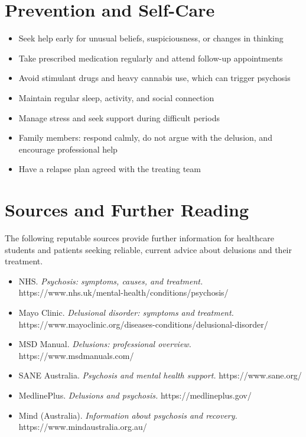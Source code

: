 \section*{Prevention and Self-Care}
\begin{itemize}
    \item Seek help early for unusual beliefs, suspiciousness, or changes in thinking
    \item Take prescribed medication regularly and attend follow-up appointments
    \item Avoid stimulant drugs and heavy cannabis use, which can trigger psychosis
    \item Maintain regular sleep, activity, and social connection
    \item Manage stress and seek support during difficult periods
    \item Family members: respond calmly, do not argue with the delusion, and encourage professional help
    \item Have a relapse plan agreed with the treating team
\end{itemize}

\section*{Sources and Further Reading}
The following reputable sources provide further information for healthcare students and patients seeking reliable, current advice about delusions and their treatment.

\begin{itemize}
    \item NHS. \textit{Psychosis: symptoms, causes, and treatment.} https://www.nhs.uk/mental-health/conditions/psychosis/
    \item Mayo Clinic. \textit{Delusional disorder: symptoms and treatment.} https://www.mayoclinic.org/diseases-conditions/delusional-disorder/
    \item MSD Manual. \textit{Delusions: professional overview.} https://www.msdmanuals.com/
    \item SANE Australia. \textit{Psychosis and mental health support.} https://www.sane.org/
    \item MedlinePlus. \textit{Delusions and psychosis.} https://medlineplus.gov/
    \item Mind (Australia). \textit{Information about psychosis and recovery.} https://www.mindaustralia.org.au/
\end{itemize}
